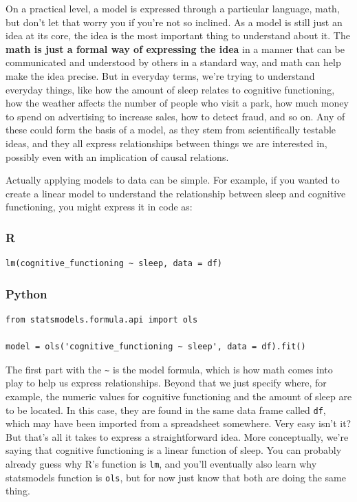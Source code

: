 \documentclass[
  letterpaper,
]{krantz}
\begin{document}
On a practical level, a model is expressed through a particular
language, math, but don't let that worry you if you're not so inclined.
As a model is still just an idea at its core, the idea is the most
important thing to understand about it. The \textbf{math is just a
formal way of expressing the idea} in a manner that can be communicated
and understood by others in a standard way, and math can help make the
idea precise. But in everyday terms, we're trying to understand everyday
things, like how the amount of sleep relates to cognitive functioning,
how the weather affects the number of people who visit a park, how much
money to spend on advertising to increase sales, how to detect fraud,
and so on. Any of these could form the basis of a model, as they stem
from scientifically testable ideas, and they all express relationships
between things we are interested in, possibly even with an implication
of causal relations.

Actually applying models to data can be simple. For example, if you
wanted to create a linear model to understand the relationship between
sleep and cognitive functioning, you might express it in code as:

\subsubsection{R}

\begin{verbatim}
lm(cognitive_functioning ~ sleep, data = df)
\end{verbatim}

\subsubsection{Python}

\begin{verbatim}
from statsmodels.formula.api import ols

model = ols('cognitive_functioning ~ sleep', data = df).fit()
\end{verbatim}

The first part with the \texttt{\textasciitilde{}} is the model formula,
which is how math comes into play to help us express relationships.
Beyond that we just specify where, for example, the numeric values for
cognitive functioning and the amount of sleep are to be located. In this
case, they are found in the same data frame called \texttt{df}, which
may have been imported from a spreadsheet somewhere. Very easy isn't it?
But that's all it takes to express a straightforward idea. More
conceptually, we're saying that cognitive functioning is a linear
function of sleep. You can probably already guess why R's function is
\texttt{lm}, and you'll eventually also learn why {statsmodels} function
is \texttt{ols}, but for now just know that both are doing the same
thing.
\end{document}
